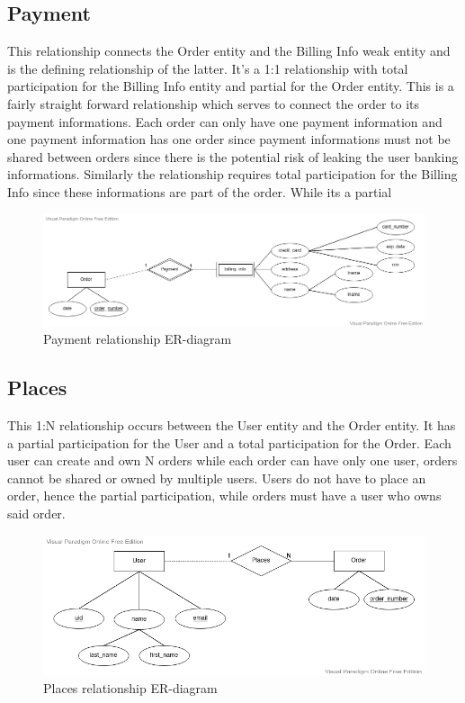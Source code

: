\documentclass[fleqn]{scrreprt}
\begin{document}
\subsection{Payment}
This relationship connects the Order entity and the Billing Info weak entity
and is the defining relationship of the latter. It's a 1:1 relationship with
total participation for the Billing Info entity and partial for the Order entity.
This is a fairly straight forward
relationship which serves to connect the order to its payment informations. Each
order can only have one payment information and one payment information has
one order since payment informations must not be shared between orders since
there is the potential risk of leaking the user banking informations. Similarly
the relationship requires total participation for the Billing Info since these
informations are part of the order. While its a partial 
\begin{figure}[h]\centering
    \includegraphics[width=\columnwidth]{er-diagram-project-Payment.vpd.png}
    \caption{Payment relationship ER-diagram}\label{fig:erp}
\end{figure}

\subsection{Places}
This 1:N relationship occurs between the User entity and the Order entity. It
has a partial participation for the User and a total participation for the Order.
Each user can create and own N orders while each order can have only one user,
orders cannot be shared or owned by multiple users. Users do not have to place
an order, hence the partial participation, while orders must have a user who
owns said order.
\begin{figure}[h]\centering
    \includegraphics[width=.8\columnwidth]{er-diagram-project-Places.vpd.png}
    \caption{Places relationship ER-diagram}\label{fig:erpl}
\end{figure}
\end{document}
